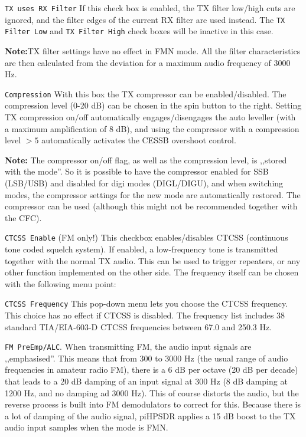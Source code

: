 \documentclass[12pt]{book}
\def\rett#1{\texttt{\color{red}#1}}
\def\pH{pi\-HPSDR\xspace}
\begin{document}
\rett{TX uses RX Filter} If this check box is enabled, the TX filter low/high cuts are ignored,
and the filter edges of the current RX filter are used instead. The \rett{TX Filter Low}
and \rett{TX Filter High} check boxes will be inactive in this case.

\textbf{Note:}TX filter settings have no effect in FMN mode.
All the filter characteristics are then calculated from the deviation for
a maximum audio frequency of 3000 Hz.

\rett{Compression} With this box the TX compressor can be enabled/disabled.
The compression level (0-20 dB) can be chosen in the spin button to the right.
Setting TX compression on/off automatically engages/disengages the auto leveller
(with a maximum amplification of 8 dB), and using the compressor with a compression
level $> 5$  automatically activates the CESSB overshoot control.

\textbf{Note:} The compressor on/off flag, as well as the compression level, is
,,stored with the mode''. So it is possible to have the compressor enabled for SSB
(LSB/USB)
and disabled for digi modes (DIGL/DIGU), and when switching modes, the compressor
settings for the new mode are automatically restored. The compressor can be used (although
this might not be recommended together with the CFC).

\rett{CTCSS Enable} (FM only!) This checkbox enables/disables CTCSS (continuous tone coded squelch system).
If enabled, a low-frequency
tone is transmitted together with the normal TX audio. This can be used to trigger repeaters, or any other
function implemented
on the other side. The frequency itself can be chosen with the following menu point:

\rett{CTCSS Frequency} This pop-down menu lets you choose the CTCSS frequency. This choice has no effect if
CTCSS is disabled.
The frequency list includes 38 standard TIA/EIA-603-D CTCSS frequencies between 67.0 and 250.3 Hz.

\rett{FM PreEmp/ALC}. When transmitting FM, the audio input signals are ,,emphasised''.
This means that from 300 to 3000 Hz (the usual range of audio frequencies in amateur
radio FM), there is a 6 dB per octave (20 dB per decade) that leads to a 20 dB damping
of an input signal at 300 Hz (8 dB damping at 1200 Hz, and no damping ad 3000 Hz).
This of course distorts the audio, but the reverse process is built into FM demodulators
to correct for this. Because there is a lot of damping of the audio signal, \pH
applies a 15 dB boost to the TX audio input samples when the mode is FMN.
\end{document}
